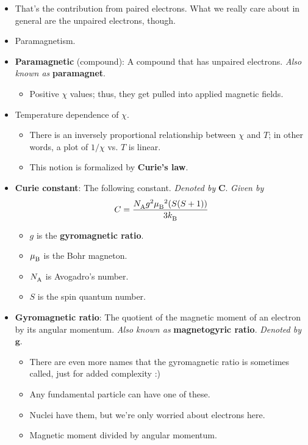 \documentclass[../notes.tex]{subfiles}
\begin{document}
\begin{itemize}
    \item That's the contribution from paired electrons. What we really care about in general are the unpaired electrons, though.
    \item Paramagnetism.
    \item \textbf{Paramagnetic} (compound): A compound that has unpaired electrons. \emph{Also known as} \textbf{paramagnet}.
    \begin{itemize}
        \item Positive $\chi$ values; thus, they get pulled into applied magnetic fields.
    \end{itemize}
    \item Temperature dependence of $\chi$.
    \begin{itemize}
        \item There is an inversely proportional relationship between $\chi$ and $T$; in other words, a plot of $1/\chi$ vs. $T$ is linear.
        \item This notion is formalized by \textbf{Curie's law}.
    \end{itemize}
    \item \textbf{Curie constant}: The following constant. \emph{Denoted by} $\bm{C}$. \emph{Given by}
    \begin{equation*}
        C = \frac{{N_\text{A}^{}} g^2{\mu_\text{B}^{}}^2(S(S+1))}{3{k_\text{B}^{}}}
    \end{equation*}
    \begin{itemize}
        \item $g$ is the \textbf{gyromagnetic ratio}.
        \item ${\mu_\text{B}^{}}$ is the Bohr magneton.
        \item ${N_\text{A}^{}}$ is Avogadro's number.
        \item $S$ is the spin quantum number.
    \end{itemize}
    \item \textbf{Gyromagnetic ratio}: The quotient of the magnetic moment of an electron by its angular momentum. \emph{Also known as} \textbf{magnetogyric ratio}. \emph{Denoted by} $\bm{g}$.
    \begin{itemize}
        \item There are even more names that the gyromagnetic ratio is sometimes called, just for added complexity :)
        \item Any fundamental particle can have one of these.
        \item Nuclei have them, but we're only worried about electrons here.
        \item Magnetic moment divided by angular momentum.

\end{itemize}
\end{itemize}
\end{document}
